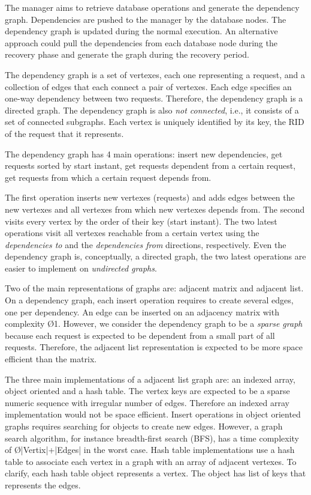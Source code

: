 The manager aims to retrieve database operations and generate the dependency graph. Dependencies are pushed to the manager by the database nodes. The dependency graph is updated during the normal execution. An alternative approach could pull the dependencies from each database node during the recovery phase and generate the graph during the recovery period.

The dependency graph is a set of vertexes, each one representing a request, and a collection of edges that each connect a pair of vertexes. Each edge specifies an one-way dependency between two requests. Therefore, the dependency graph is a directed graph. The dependency graph is also \emph{not connected}, i.e., it consists of a set of connected subgraphs. Each vertex is uniquely identified by its key, the \ac{RID} of the request that it represents. 


The dependency graph has 4 main operations: insert new dependencies, get requests sorted by start instant, get requests dependent from a certain request, get requests from which a certain request depends from.

The first operation inserts new vertexes (requests) and adds edges between the new vertexes and all vertexes from which new vertexes depends from. The second visits every vertex by the order of their key (start instant). The two latest operations visit all vertexes reachable from a certain vertex using the \emph{dependencies to} and the \emph{dependencies from} directions, respectively. Even the dependency graph is, conceptually, a directed graph, the two latest operations are easier to implement on \emph{undirected graphs}.

Two of the main representations of graphs are: adjacent matrix and adjacent list. On a dependency graph, each insert operation requires to create several edges, one per dependency. An edge can be inserted on an adjacency matrix with complexity \O{1}. However, we consider the dependency graph to be a \emph{sparse graph} because each request is expected to be dependent from a small part of all requests. Therefore, the adjacent list representation is expected to be more space efficient than the matrix.

The three main implementations of a adjacent list graph are: an indexed array, object oriented and a hash table. The vertex keys are expected to be a sparse numeric sequence with irregular number of edges. Therefore an indexed array implementation would not be space efficient. Insert operations in object oriented graphs requires searching for objects to create new edges. However, a graph search algorithm, for instance breadth-first search (BFS), has a time complexity of \O{|Vertix|+|Edges|} in the worst case.
Hash table implementations use a hash table to associate each vertex in a graph with an array of adjacent vertexes. To clarify, each hash table object represents a vertex. The object has list of keys that represents the edges. \\

